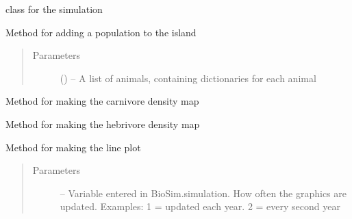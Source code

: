 \documentclass[a4paper,10pt,english]{sphinxmanual}
\begin{document}
\begin{fulllineitems}
\label{\detokenize{simulation:biosim.simulation.BioSim}}
class for the simulation

\begin{fulllineitems}
\label{\detokenize{simulation:biosim.simulation.BioSim.add_population}}
Method for adding a population to the island
\begin{quote}\begin{description}
\item[{Parameters}] \leavevmode
{} () -- A list of animals, containing dictionaries for each animal

\end{description}\end{quote}

\end{fulllineitems}


\begin{fulllineitems}
\label{\detokenize{simulation:biosim.simulation.BioSim.make_carnivore_density_map}}
Method for making the carnivore density map

\end{fulllineitems}


\begin{fulllineitems}
\label{\detokenize{simulation:biosim.simulation.BioSim.make_herbivore_density_map}}
Method for making the hebrivore density map

\end{fulllineitems}


\begin{fulllineitems}
\label{\detokenize{simulation:biosim.simulation.BioSim.make_line_plot}}
Method for making the line plot
\begin{quote}\begin{description}
\item[{Parameters}] \leavevmode
{} -- Variable entered in BioSim.simulation.
How often the graphics are updated.
Examples: 1 = updated each year. 2 = every second year


\end{description}
\end{quote}
\end{fulllineitems}
\end{fulllineitems}
\end{document}

